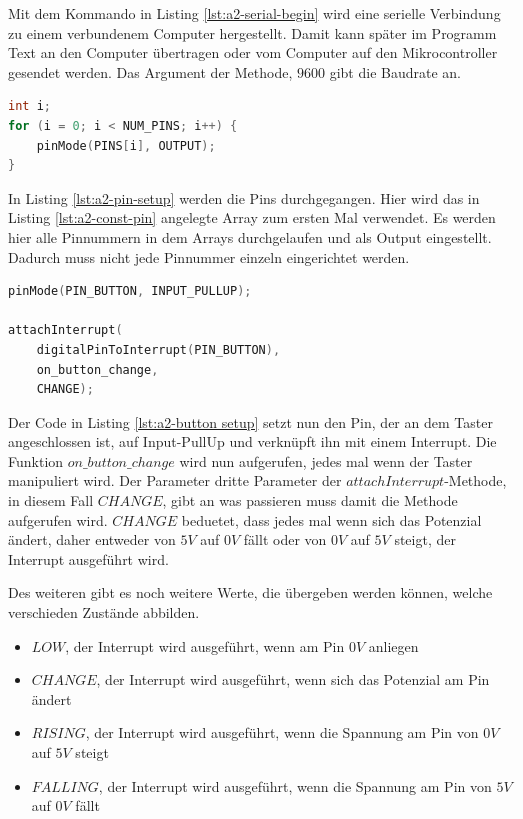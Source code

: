 Mit dem Kommando in Listing \ref{lst:a2-serial-begin} wird eine serielle Verbindung zu einem verbundenem Computer hergestellt.
Damit kann später im Programm Text an den Computer übertragen oder vom Computer auf den Mikrocontroller gesendet werden.
Das Argument der Methode, $9600$ gibt die Baudrate an.

\begin{lstlisting}[language=C,label={lst:a2-pin-setup}, caption={Konfiguration der Pins}]
int i;
for (i = 0; i < NUM_PINS; i++) {
    pinMode(PINS[i], OUTPUT);
}
\end{lstlisting}

In Listing \ref{lst:a2-pin-setup} werden die Pins durchgegangen.
Hier wird das in Listing \ref{lst:a2-const-pin} angelegte Array zum ersten Mal verwendet.
Es werden hier alle Pinnummern in dem Arrays durchgelaufen und als Output eingestellt.
Dadurch muss nicht jede Pinnummer einzeln eingerichtet werden.

\begin{lstlisting}[language=C,label={lst:a2-button setup}, caption={Einstellen des Buttons}]
pinMode(PIN_BUTTON, INPUT_PULLUP);

attachInterrupt(
    digitalPinToInterrupt(PIN_BUTTON),
    on_button_change,
    CHANGE);
\end{lstlisting}

Der Code in Listing \ref{lst:a2-button setup} setzt nun den Pin, der an dem Taster angeschlossen ist, auf Input-PullUp und verknüpft ihn mit einem Interrupt.
Die Funktion $on\_button\_change$ wird nun aufgerufen, jedes mal wenn der Taster manipuliert wird.
Der Parameter dritte Parameter der $attachInterrupt$-Methode, in diesem Fall $CHANGE$, gibt an was passieren muss damit die Methode aufgerufen wird.
$CHANGE$ beduetet, dass jedes mal wenn sich das Potenzial ändert, daher entweder von $5V$ auf $0V$ fällt oder von $0V$ auf $5V$ steigt, der Interrupt ausgeführt wird.

Des weiteren gibt es noch weitere Werte, die übergeben werden können, welche verschieden Zustände abbilden.

\begin{itemize}
    \item $LOW$, der Interrupt wird ausgeführt, wenn am Pin $0V$ anliegen
    \item $CHANGE$, der Interrupt wird ausgeführt, wenn sich das Potenzial am Pin ändert
    \item $RISING$, der Interrupt wird ausgeführt, wenn die Spannung am Pin von $0V$ auf $5V$ steigt
    \item $FALLING$, der Interrupt wird ausgeführt, wenn die Spannung am Pin von $5V$ auf $0V$ fällt
\end{itemize}

